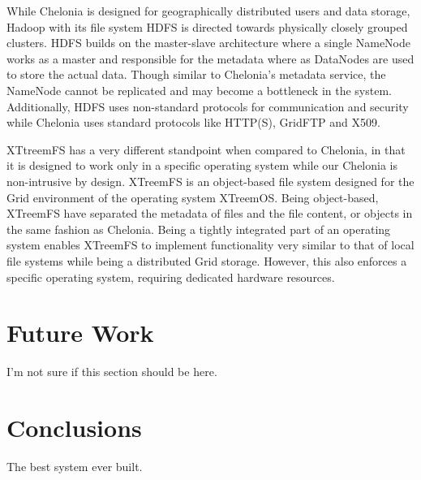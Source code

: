 \documentclass[preprint,12pt]{elsarticle}
\begin{document}
While Chelonia is designed for geographically distributed users and
data storage, Hadoop \cite{} with its file system HDFS is directed
towards physically closely grouped clusters. HDFS builds on the
master-slave architecture where a single NameNode works as a master
and responsible for the metadata where as DataNodes are used to store
the actual data. Though similar to Chelonia’s metadata service, the
NameNode cannot be replicated and may become a bottleneck in the
system. Additionally, HDFS uses non-standard protocols for
communication and security while Chelonia uses standard protocols like
HTTP(S), GridFTP and X509.

XTtreemFS \cite{} has a very different standpoint when compared to
Chelonia, in that it is designed to work only in a specific operating
system while our Chelonia is non-intrusive by design. XTreemFS is an
object-based file system designed for the Grid environment of the
operating system XTreemOS. Being object-based, XTreemFS have separated
the metadata of files and the file content, or objects in the same
fashion as Chelonia. Being a tightly integrated part of an operating
system enables XTreemFS to implement functionality very similar to
that of local file systems while being a distributed Grid
storage. However, this also enforces a specific operating system,
requiring dedicated hardware resources.

\section{Future Work}
\label{sec:futurework}
I'm not sure if this section should be here.

\section{Conclusions}
The best system ever built.




\begin{thebibliography}{00}


\bibitem{}

\end{thebibliography}
\end{document}
